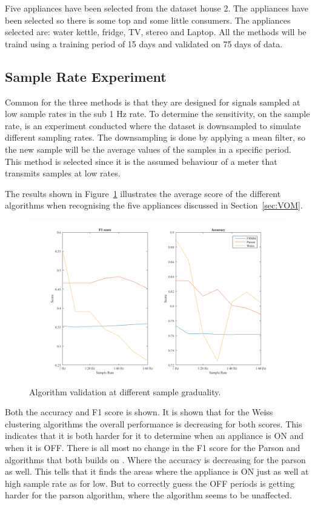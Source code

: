 Five appliances have been selected from the  dataset house 2. The appliances have been selected so there is some top and some little consumers. The appliances selected are: water kettle, fridge, TV, stereo and Laptop. All the methods will be traind using a training period of 15 days and validated on 75 days of data. 

\subsection{Sample Rate Experiment}
Common for the three methods is that they are designed for signals sampled at low sample rates in the sub 1 Hz rate. To determine the sensitivity, on the sample rate, is an experiment conducted where the dataset is downsampled to simulate different sampling rates. The downsampling is done by applying a mean filter, so the new sample will be the average values of the samples in a specific period. This method is selected since it is the assumed behaviour of a meter that transmits samples at low rates. 

The results shown in Figure~\ref{fig:DSE} illustrates the average score of the different algorithms when recognising the five appliances discussed in Section~\ref{sec:VOM}. 

\begin{figure}[H]
\centering
\includegraphics[width=1\textwidth]{billeder/AlgoScoreNilm.png}
\caption{Algorithm validation at different sample graduality.}
\label{fig:DSE}
\end{figure}

Both the accuracy and F1 score is shown. It is shown that for the Weiss clustering algorithms the overall performance is decreasing for both scores. This indicates that it is both harder for it to determine when an appliance is ON and when it is OFF. There is all most no change in the F1 score for the Parson and  algorithms that both builds on . Where the accuracy is decreasing for the parson as well. This tells that it finds the areas where the appliance is ON just as well at high sample rate as for low. But to correctly guess the OFF periods is getting harder for the parson algorithm, where the  algorithm seems to be unaffected. 

